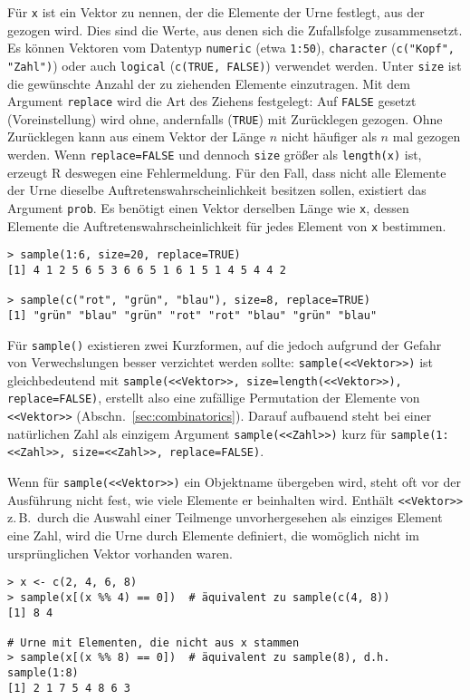 Für \lstinline!x! ist ein Vektor zu nennen, der die Elemente der Urne festlegt, aus der gezogen wird. Dies sind die Werte, aus denen sich die Zufallsfolge zusammensetzt. Es können Vektoren vom Datentyp \lstinline!numeric! (etwa \lstinline!1:50!), \lstinline!character! (\lstinline!c("Kopf", "Zahl")!) oder auch \lstinline!logical! (\lstinline!c(TRUE, FALSE)!) verwendet werden. Unter \lstinline!size! ist die gewünschte Anzahl der zu ziehenden Elemente einzutragen. Mit dem Argument \lstinline!replace! wird die Art des Ziehens festgelegt: Auf \lstinline!FALSE! gesetzt (Voreinstellung) wird ohne, andernfalls (\lstinline!TRUE!) mit Zurücklegen gezogen. Ohne Zurücklegen kann aus einem Vektor der Länge $n$ nicht häufiger als $n$ mal gezogen werden. Wenn \lstinline!replace=FALSE! und dennoch \lstinline!size! größer als \lstinline!length(x)! ist, erzeugt R deswegen eine Fehlermeldung. Für den Fall, dass nicht alle Elemente der Urne dieselbe Auftretenswahrscheinlichkeit besitzen sollen, existiert das Argument \lstinline!prob!. Es benötigt einen Vektor derselben Länge wie \lstinline!x!, dessen Elemente die Auftretenswahrscheinlichkeit für jedes Element von \lstinline!x! bestimmen.
\begin{lstlisting}
> sample(1:6, size=20, replace=TRUE)
[1] 4 1 2 5 6 5 3 6 6 5 1 6 1 5 1 4 5 4 4 2

> sample(c("rot", "grün", "blau"), size=8, replace=TRUE)
[1] "grün" "blau" "grün" "rot" "rot" "blau" "grün" "blau"
\end{lstlisting}

Für \lstinline!sample()! existieren zwei Kurzformen, auf die jedoch aufgrund der Gefahr von Verwechslungen besser verzichtet werden sollte: \lstinline!sample(<<Vektor>>)! ist gleichbedeutend mit \lstinline!sample(<<Vektor>>, size=length(<<Vektor>>), replace=FALSE)!, erstellt also eine zufällige Permutation der Elemente von \lstinline!<<Vektor>>! (Abschn.\ \ref{sec:combinatorics}). Darauf aufbauend steht bei einer natürlichen Zahl als einzigem Argument \lstinline!sample(<<Zahl>>)! kurz für \lstinline!sample(1:<<Zahl>>, size=<<Zahl>>, replace=FALSE)!.

Wenn für \lstinline!sample(<<Vektor>>)! ein Objektname übergeben wird, steht oft vor der Ausführung nicht fest, wie viele Elemente er beinhalten wird. Enthält \lstinline!<<Vektor>>! z.\,B.\ durch die Auswahl einer Teilmenge unvorhergesehen als einziges Element eine Zahl, wird die Urne durch Elemente definiert, die womöglich nicht im ursprünglichen Vektor vorhanden waren.
\begin{lstlisting}
> x <- c(2, 4, 6, 8)
> sample(x[(x %% 4) == 0])  # äquivalent zu sample(c(4, 8))
[1] 8 4

# Urne mit Elementen, die nicht aus x stammen
> sample(x[(x %% 8) == 0])  # äquivalent zu sample(8), d.h. sample(1:8)
[1] 2 1 7 5 4 8 6 3
\end{lstlisting}

